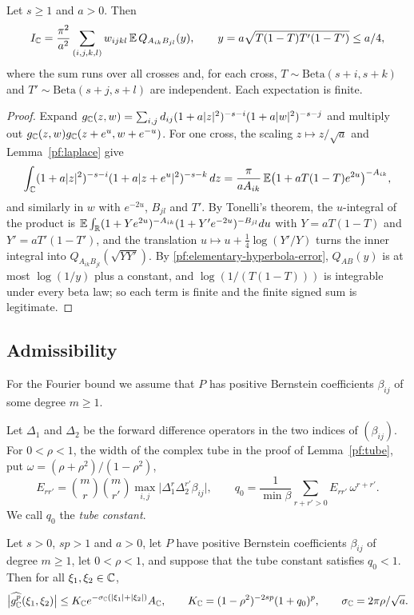 \begin{lemma}\label{pf:pair-reduction}
Let $s\ge1$ and $a>0$. Then
\[
 I_\mathbb C=\frac{\pi^2}{a^2}\sum_{(i,j,k,l)}w_{ijkl}\,
 \mathbb E\,Q_{A_{ik}B_{jl}}(y),\qquad
 y=a\sqrt{T(1-T)T'(1-T')}\le a/4,
\]
where the sum runs over all crosses and, for each cross,
$T\sim\mathrm{Beta}(s+i,s+k)$ and $T'\sim\mathrm{Beta}(s+j,s+l)$ are
independent. Each expectation is finite.
\end{lemma}

\begin{proof}
Expand $g_\mathbb C(z,w)=\sum_{i,j}d_{ij}(1+a|z|^2)^{-s-i}(1+a|w|^2)^{-s-j}$ and
multiply out $g_\mathbb C(z,w)g_\mathbb C(z+e^u,w+e^{-u})$. For one cross, the scaling
$z\mapsto z/\sqrt a$ and Lemma~\ref{pf:laplace} give
\[
 \int_\mathbb C(1+a|z|^2)^{-s-i}(1+a|z+e^u|^2)^{-s-k}\,dz
 =\frac\pi{aA_{ik}}\,\mathbb E\bigl(1+aT(1-T)e^{2u}\bigr)^{-A_{ik}},
\]
and similarly in $w$ with $e^{-2u}$, $B_{jl}$ and $T'$. By Tonelli's
theorem, the $u$-integral of the product is
$\mathbb E\int_\mathbb R(1+Ye^{2u})^{-A_{ik}}(1+Y'e^{-2u})^{-B_{jl}}du$ with
$Y=aT(1-T)$ and $Y'=aT'(1-T')$, and the translation
$u\mapsto u+\frac14\log(Y'/Y)$ turns the inner integral into
$Q_{A_{ik}B_{jl}}(\sqrt{YY'})$. By
\eqref{pf:elementary-hyperbola-error}, $Q_{AB}(y)$ is at most
$\log(1/y)$ plus a constant, and $\log(1/(T(1-T)))$ is integrable under
every beta law; so each term is finite and the finite signed sum is
legitimate.
\end{proof}

\subsection{Admissibility}

For the Fourier bound we assume that $P$ has positive Bernstein
coefficients $\beta_{ij}$ of some degree $m\ge1$.

\begin{definition}\label{pf:tube-constant}
Let $\Delta_1$ and $\Delta_2$ be the forward difference operators in
the two indices of $(\beta_{ij})$. For $0<\rho<1$, the width of the
complex tube in the proof of Lemma~\ref{pf:tube}, put
$\omega=(\rho+\rho^2)/(1-\rho^2)$,
\[
 E_{rr'}=\binom mr\binom m{r'}\max_{i,j}\bigl|\Delta_1^r\Delta_2^{r'}
 \beta_{ij}\bigr|,\qquad
 q_0=\frac1{\min\beta}\sum_{r+r'>0}E_{rr'}\,\omega^{r+r'} .
\]
We call $q_0$ the \emph{tube constant}.
\end{definition}

\begin{lemma}\label{pf:tube}
Let $s>0$, $sp>1$ and $a>0$, let $P$ have positive Bernstein coefficients
$\beta_{ij}$ of degree $m\ge1$, let $0<\rho<1$, and suppose that the tube
constant satisfies $q_0<1$. Then for all $\xi_1,\xi_2\in\mathbb C$,
\[
 \bigl|\widehat{g_\mathbb C^p}(\xi_1,\xi_2)\bigr|
 \le K_\mathbb C e^{-\sigma_\mathbb C(|\xi_1|+|\xi_2|)}A_\mathbb C,\qquad
 K_\mathbb C=(1-\rho^2)^{-2sp}(1+q_0)^p,\qquad
 \sigma_\mathbb C=2\pi\rho/\sqrt a .
\]
\end{lemma}


